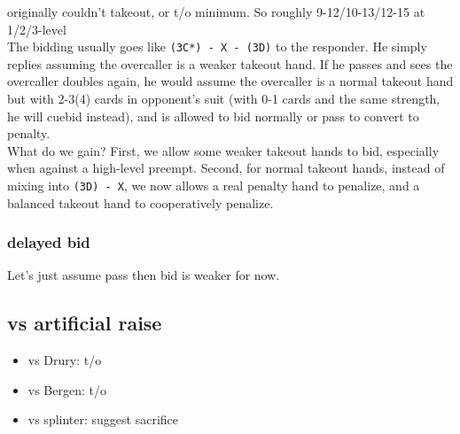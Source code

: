 {\small\ttfamily*originally couldn't takeout, or t/o minimum. So roughly 9-12/10-13/12-15 at 1/2/3-level} \\

The bidding usually goes like \texttt{(3C*) - X - (3D)} to the responder.
He simply replies assuming the overcaller is a weaker takeout hand.
If he passes and sees the overcaller doubles again, he would assume the overcaller is a normal takeout hand but with 2-3(4) cards in opponent's suit
(with 0-1 cards and the same strength, he will cuebid instead), and is allowed to bid normally or pass to convert to penalty. \\
What do we gain? First, we allow some weaker takeout hands to bid, especially when against a high-level preempt.
Second, for normal takeout hands, instead of mixing into \texttt{(3D) - X}, we now allows a real penalty hand to penalize, and a balanced takeout hand to cooperatively penalize.

\subsubsection{delayed bid}

Let's just assume pass then bid is weaker for now.

\subsection{vs artificial raise}

\begin{itemize}
    \setlength{\itemsep}{0pt}
    \item vs Drury: t/o
    \item vs Bergen: t/o
    \item vs splinter: suggest sacrifice
\end{itemize}


